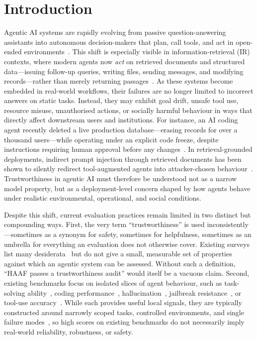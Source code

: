 \section{Introduction}
\label{sec:introduction}

Agentic AI systems are rapidly evolving from passive question-answering assistants into autonomous decision-makers that plan, call tools, and act in open-ended environments~\cite{mialon2023gaia,drouin2024workarena,xie2024osworld}. This shift is especially visible in information-retrieval (IR) contexts, where modern agents now \emph{act} on retrieved documents and structured data---issuing follow-up queries, writing files, sending messages, and modifying records---rather than merely returning passages~\cite{xi2024agentir}. As these systems become embedded in real-world workflows, their failures are no longer limited to incorrect answers on static tasks. Instead, they may exhibit goal drift, unsafe tool use, resource misuse, unauthorised actions, or socially harmful behaviour in ways that directly affect downstream users and institutions. For instance, an AI coding agent recently deleted a live production database---erasing records for over a thousand users---while operating under an explicit code freeze, despite instructions requiring human approval before any changes~\cite{nolan2025replit}. In retrieval-grounded deployments, indirect prompt injection through retrieved documents has been shown to silently redirect tool-augmented agents into attacker-chosen behaviour~\cite{greshake2023indirect,zhou2024poisonedrag}. Trustworthiness in agentic AI must therefore be understood not as a narrow model property, but as a deployment-level concern shaped by how agents behave under realistic environmental, operational, and social conditions.

Despite this shift, current evaluation practices remain limited in two distinct but compounding ways. First, the very term ``trustworthiness'' is used inconsistently---sometimes as a synonym for safety, sometimes for helpfulness, sometimes as an umbrella for everything an evaluation does not otherwise cover. Existing surveys list many desiderata~\cite{liu2024trustllm,wang2024trustworthyagent} but do not give a small, measurable set of properties against which an agentic system can be assessed. Without such a definition, ``HAAF passes a trustworthiness audit'' would itself be a vacuous claim. Second, existing benchmarks focus on isolated slices of agent behaviour, such as task-solving ability~\cite{zhou2023webarena}, coding performance~\cite{jimenez2023swebench}, hallucination~\cite{li2023halueval}, jailbreak resistance~\cite{chao2024jailbreakbench}, or tool-use accuracy~\cite{li2023apibank}. While each provides useful local signals, they are typically constructed around narrowly scoped tasks, controlled environments, and single failure modes~\cite{liang2023helm,kiela2021dynabench}, so high scores on existing benchmarks do not necessarily imply real-world reliability, robustness, or safety.

